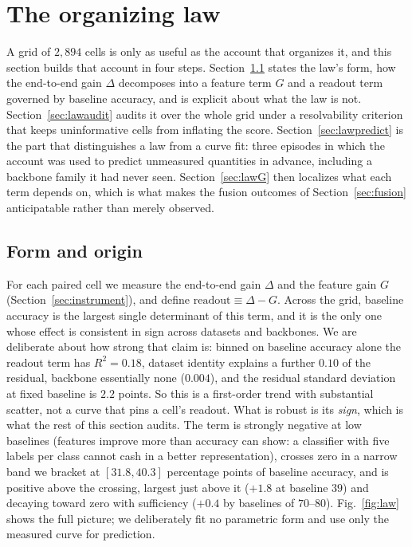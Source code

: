 \section{The organizing law}\label{sec:law}

A grid of $2{,}894$ cells is only as useful as the account that organizes
it, and this section builds that account in four steps.
Section~\ref{sec:lawform} states the law's form, how the end-to-end gain
$\Delta$ decomposes into a feature term $G$ and a readout term governed
by baseline accuracy, and is explicit about what the law is not.
Section~\ref{sec:lawaudit} audits it over the whole grid under a
resolvability criterion that keeps uninformative cells from inflating the
score. Section~\ref{sec:lawpredict} is the part that distinguishes a law
from a curve fit: three episodes in which the account was used to predict
unmeasured quantities in advance, including a backbone family it had
never seen. Section~\ref{sec:lawG} then localizes what each term depends
on, which is what makes the fusion outcomes of Section~\ref{sec:fusion}
anticipatable rather than merely observed.

\subsection{Form and origin}\label{sec:lawform}
For each paired cell we measure the end-to-end gain $\Delta$ and the
feature gain $G$ (Section~\ref{sec:instrument}), and define
$\mathrm{readout} \equiv \Delta - G$. Across the grid, baseline accuracy is
the largest single determinant of this term, and it is the only one whose
effect is consistent in sign across datasets and backbones. We are
deliberate about how strong that claim is: binned on baseline accuracy
alone the readout term has $R^2 = 0.18$, dataset identity explains a
further $0.10$ of the residual, backbone essentially none ($0.004$), and
the residual standard deviation at fixed baseline is $2.2$ points. So this
is a first-order trend with substantial scatter, not a curve that pins a
cell's readout. What is robust is its \emph{sign}, which is what the rest
of this section audits. The term is
strongly negative at low baselines (features improve more than accuracy
can show: a classifier with five labels per class cannot cash in a better
representation), crosses zero in a narrow band we bracket at
$[31.8, 40.3]$ percentage points of baseline accuracy, and is positive
above the crossing, largest just above it ($+1.8$ at baseline $39$) and
decaying toward zero with sufficiency ($+0.4$ by baselines of
$70$--$80$). Fig.~\ref{fig:law} shows the full picture; we deliberately
fit no parametric form and use only the measured curve for prediction.

